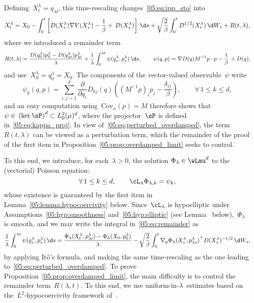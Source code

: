 Defining~$X^\lambda_t = q_{\lambda t}$, this time-rescaling changes~\eqref{05:eq:ipp_sto} into
\begin{equation}
    \label{05:eq:perturbed_overdamped}
    X_t^\lambda = X_0 -\int_0^t \left[D(X_s^\lambda)\nabla V(X_s^\lambda)-\frac1\beta\div\, D(X_s^\lambda)\right]\,\d s + \sqrt{\frac{2}{\beta}}\int_0^t D^{1/2}(X_t^\lambda)\,\d W_s + R(t,\lambda),
\end{equation}
where we introduced a remainder term
\begin{equation}
    \label{05:eq:remainder}
    R(t,\lambda) = \frac{D(q_0^\lambda)p_0^\lambda-D(q_{\lambda t}^\lambda)p_{\lambda t}^\lambda}{\lambda} + \frac1\lambda\int_0^{\lambda t} \psi(q_s^\lambda,p_{s}^\lambda)\,\d s,\qquad \psi(q,p) = \nabla D(q)M^{-1}p\cdot p - \frac1\beta\,\div D(q),
\end{equation}
and use~$X_0^\lambda=q_0^\lambda=X_0$.
The components of the vector-valued observable~$\psi$ write
$$\psi_k(q,p) = \sum_{i,j=1}^d \frac{\partial}{\partial q_i} D_{kj}(q)\left((M^{-1}p)_i p_j -\frac{\delta_{ij}}\beta\right),\qquad\forall\,1\leq k\leq d,$$
and an easy computation using~$\mathrm{Cov}_\kappa(p)=M$ therefore shows that~$\psi\in\,\left(\ker\sP\right)^d \subset L_0^2(\mu)^d$, where the projector~$\sP$ is defined in~\eqref{05:eq:kappa_proj}.
In view of~\eqref{05:eq:perturbed_overdamped}, the term~$R(t,\lambda)$ can be viewed as a perturbation term, which the remainder of the proof of the first item in Proposition~\ref{05:prop:overdamped_limit} seeks to control.

To this end, we introduce, for each~$\lambda>0$, the solution $\Phi_\lambda\in \wLmu^d$ to the (vectorial) Poisson equation:
\begin{equation}
    \label{05:eq:poisson_equation}
    \forall\,1\leq k\leq d,\qquad\cL_\lambda\Phi_{\lambda,k} = \psi_k,
\end{equation}
whose existence is guaranteed by the first item in Lemma~\ref{05:lemma:hypocoercivity} below.
Since~$\cL_\lambda$ is hypoelliptic under Assumptions~\eqref{05:hyp:smoothness} and~\eqref{05:hyp:elliptic} (see Lemma~ below),~$\Phi_\lambda$ is smooth, and we may write the integral in~\eqref{05:eq:remainder} as 
\begin{equation}
    \frac1\lambda\int_0^{\lambda t} \psi(q_s^\lambda,p_{ s}^\lambda)\,\d s = \frac{\Phi_\lambda(X_t^\lambda,p_{\lambda t}^\lambda) - \Phi_\lambda(X_0,p_0^\lambda)}{\lambda} - \sqrt{\frac{2}{\beta}}\int_0^t \nabla_p \Phi_{\lambda}(X_s^\lambda,p_{\lambda s}^\lambda)^\top D(X_s^\lambda)^{-1/2}\,\d W_s,
\end{equation}
by applying It\^o's formula, and making the same time-rescaling as the one leading to~\eqref{05:eq:perturbed_overdamped}. To prove Proposition~\ref{05:prop:overdamped_limit}, the main difficulty is to control the remainder term~$R(\lambda,t)$. To this end, we use uniform-in-$\lambda$~estimates based on the~$L^2$-hypocoercivity framework of~\cite{DMS15}.
